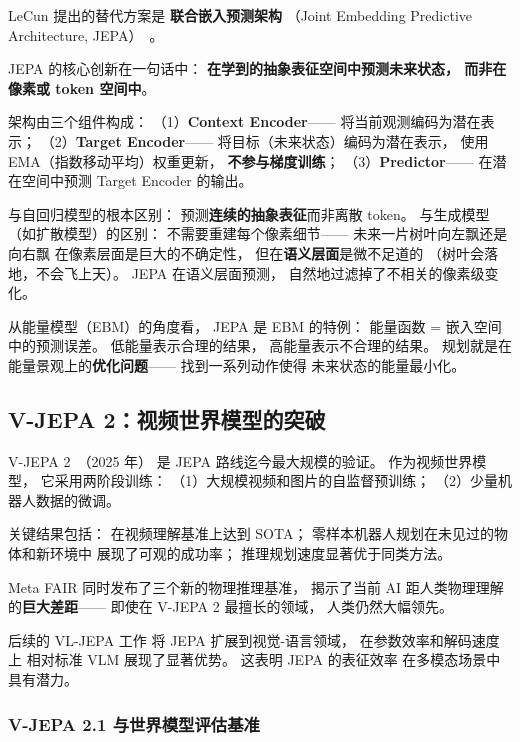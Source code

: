 LeCun 提出的替代方案是
\textbf{联合嵌入预测架构}
（Joint Embedding Predictive Architecture, JEPA）~\cite{lecun2022path}。

JEPA 的核心创新在一句话中：
\textbf{在学到的抽象表征空间中预测未来状态，
而非在像素或 token 空间中}。

架构由三个组件构成：
（1）\textbf{Context Encoder}——
将当前观测编码为潜在表示；
（2）\textbf{Target Encoder}——
将目标（未来状态）编码为潜在表示，
使用 EMA（指数移动平均）权重更新，
\textbf{不参与梯度训练}；
（3）\textbf{Predictor}——
在潜在空间中预测 Target Encoder 的输出。

与自回归模型的根本区别：
预测\textbf{连续的抽象表征}而非离散 token。
与生成模型（如扩散模型）的区别：
不需要重建每个像素细节——
未来一片树叶向左飘还是向右飘
在像素层面是巨大的不确定性，
但在\textbf{语义层面}是微不足道的
（树叶会落地，不会飞上天）。
JEPA 在语义层面预测，
自然地过滤掉了不相关的像素级变化。

从能量模型（EBM）的角度看，
JEPA 是 EBM 的特例：
能量函数 = 嵌入空间中的预测误差。
低能量表示合理的结果，
高能量表示不合理的结果。
规划就是在能量景观上的\textbf{优化问题}——
找到一系列动作使得
未来状态的能量最小化。

\subsection{V-JEPA 2：视频世界模型的突破}

V-JEPA 2~\cite{vjepa2_2025}（2025 年）
是 JEPA 路线迄今最大规模的验证。
作为视频世界模型，
它采用两阶段训练：
（1）大规模视频和图片的自监督预训练；
（2）少量机器人数据的微调。

关键结果包括：
在视频理解基准上达到 SOTA；
零样本机器人规划在未见过的物体和新环境中
展现了可观的成功率；
推理规划速度显著优于同类方法。

Meta FAIR 同时发布了三个新的物理推理基准，
揭示了当前 AI 距人类物理理解的\textbf{巨大差距}——
即使在 V-JEPA 2 最擅长的领域，
人类仍然大幅领先。

后续的 VL-JEPA 工作
将 JEPA 扩展到视觉-语言领域，
在参数效率和解码速度上
相对标准 VLM 展现了显著优势。
这表明 JEPA 的表征效率
在多模态场景中具有潜力。

\subsubsection{V-JEPA 2.1 与世界模型评估基准}

